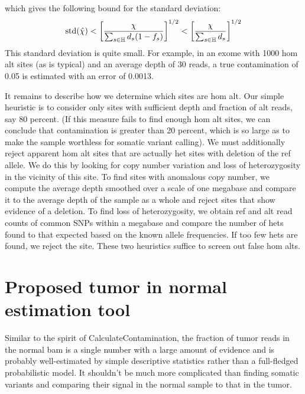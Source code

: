 \documentclass[nofootinbib,amssymb,amsmath]{revtex4}
\begin{document}
which gives the following bound for the standard deviation:
\begin{equation}
{\rm std}(\hat{\chi}) < \left[ \frac{ \chi }{  \sum_{s \in \mathbb{H}} d_s (1 - f_s) } \right]^{1/2} < \left[ \frac{ \chi }{  \sum_{s \in \mathbb{H}} d_s} \right]^{1/2}
\end{equation}
This standard deviation is quite small.  For example, in an exome with 1000 hom alt sites (as is typical) and an average depth of 30 reads, a true contamination of 0.05 is estimated with an error of 0.0013.

It remains to describe how we determine which sites are hom alt.  Our simple heuristic is to consider only sites with sufficient depth and fraction of alt reads, say 80 percent.  (If this measure fails to find enough hom alt sites, we can conclude that contamination is greater than 20 percent, which is so large as to make the sample worthless for somatic variant calling).  We must additionally reject apparent hom alt sites that are actually het sites with deletion of the ref allele.  We do this by looking for copy number variation and loss of heterozygosity in the vicinity of this site.  To find sites with anomalous copy number, we compute the average depth smoothed over a scale of one megabase and compare it to the average depth of the sample as a whole and reject sites that show evidence of a deletion.  To find loss of heterozygosity, we obtain ref and alt read counts of common SNPs within a megabase and compare the number of hets found to that expected based on the known allele frequencies.  If too few hets are found, we reject the site.  These two heuristics suffice to screen out false hom alts.

\section{Proposed tumor in normal estimation tool}
Similar to the spirit of CalculateContamination, the fraction of tumor reads in the normal bam is a single number with a large amount of evidence and is probably well-estimated by simple descriptive statistics rather than a full-fledged probabilistic model.  It shouldn't be much more complicated than finding somatic variants and comparing their signal in the normal sample to that in the tumor.
\end{document}
